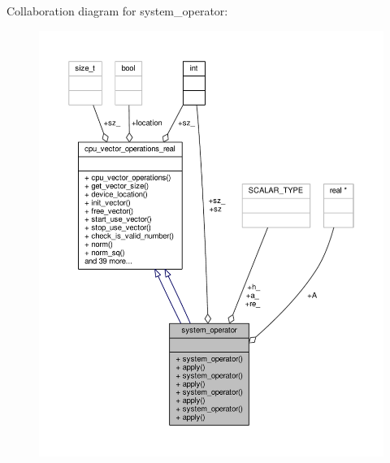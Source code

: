 Collaboration diagram for system\-\_\-operator\-:
\nopagebreak
\begin{figure}[H]
\begin{center}
\leavevmode
\includegraphics[width=350pt]{structsystem__operator__coll__graph}
\end{center}
\end{figure}
